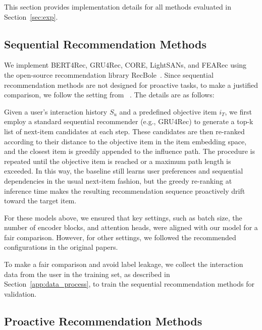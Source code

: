 \documentclass{llmxive}
\begin{document}
This section provides implementation details for all methods evaluated in Section~\ref{sec:exp}.

\subsection{Sequential Recommendation Methods}

We implement BERT4Rec, GRU4Rec, CORE, LightSANs, and FEARec using the open-source recommendation library RecBole~\cite{zhao2021recbole}. Since sequential recommendation methods are not designed for proactive tasks, to make a justified comparison, we follow the setting from ~\cite{zhao2021recbole}. The details are as follows: 

Given a user's interaction history $S_u$ and a predefined objective item $i_T$, we first employ a standard sequential recommender (e.g., GRU4Rec) to generate a top-k list of next-item candidates at each step. These candidates are then re-ranked according to their distance to the objective item in the item embedding space, and the closest item is greedily appended to the influence path. The procedure is repeated until the objective item is reached or a maximum path length is exceeded. In this way, the baseline still learns user preferences and sequential dependencies in the usual next-item fashion, but the greedy re-ranking at inference time makes the resulting recommendation sequence proactively drift toward the target item.

For these models above, we ensured that key settings, such as batch size, the number of encoder blocks, and attention heads, were aligned with our model for a fair comparison. However, for other settings, we followed the recommended configurations in the original papers.

To make a fair comparison and avoid label leakage, we collect the interaction data from the user in the training set, as described in Section~\ref{app:data_process}, to train the sequential recommendation methods for validation.

\subsection{Proactive Recommendation Methods}
\end{document}
